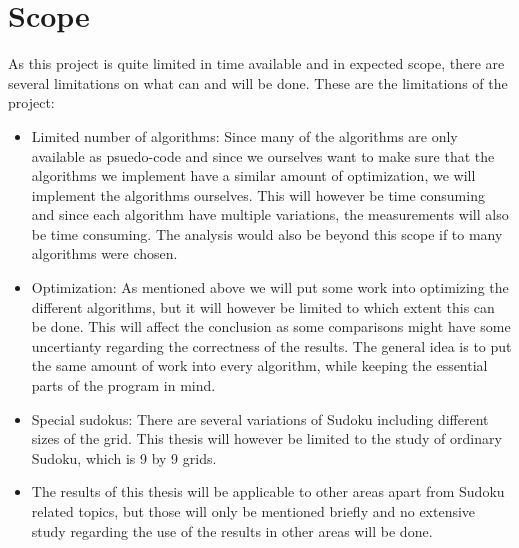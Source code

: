 \documentclass[a4paper,11pt]{kth-mag}
\begin{document}
\section{Scope}
As this project is quite limited in time available and in expected scope, 
there are several limitations on what can and will be done. 
These are the limitations of the project:
\begin{itemize}
    \item Limited number of algorithms: Since many of the algorithms are only available as psuedo-code and since we ourselves want to make sure that the algorithms we implement have a similar amount of optimization, we will implement the algorithms ourselves.
This will however be time consuming and since each algorithm have multiple variations, the measurements will also be time consuming.
The analysis would also be beyond this scope if to many algorithms were chosen.
    \item Optimization: As mentioned above we will put some work into optimizing the different algorithms, but it will however be limited to which extent this can be done.
This will affect the conclusion as some comparisons might have some uncertianty regarding the correctness of the results.
The general idea is to put the same amount of work into every algorithm, while keeping the essential parts of the program in mind.
    \item Special sudokus: There are several variations of Sudoku including different sizes of the grid.
This thesis will however be limited to the study of ordinary Sudoku, which is 9 by 9 grids.
    \item The results of this thesis will be applicable to other areas apart from Sudoku related topics, but those will only be mentioned briefly and no extensive study regarding the use of the results in other areas will be done. 
\end{itemize}
\end{document}
